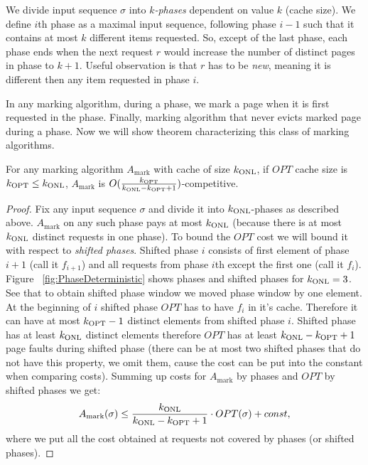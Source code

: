 We divide input sequence $\sigma$ into $k$\textit{-phases} dependent on value $k$ 
(cache size). We define $i$th phase as a maximal input sequence, following 
phase $i-1$ such that it contains at most $k$ different items requested. So, 
except of the last phase, each phase ends when the next request $r$ would 
increase the number of distinct pages in phase to $k+1$. Useful observation is 
that $r$ has to be \textit{new}, meaning it is different then any item requested 
in phase $i$.


In any marking algorithm, during a phase, we mark a page when it is first 
requested in the phase. Finally, marking algorithm that 
never evicts marked page during a phase. Now we will show theorem 
characterizing this class of marking algorithms.
\begin{theorem}\cite{torng}
For any marking algorithm $A_{\mathrm{mark}}$ with cache of size 
$k_{\mathrm{ONL}}$, if $OPT$ 
cache size is $k_{\mathrm{OPT}} \leq k_{\mathrm{ONL}}$, $A_{\mathrm{mark}}$ is 
$O(\frac{k_{\mathrm{OPT}}}{k_{\mathrm{ONL}}-k_{\mathrm{OPT}}+1})$-competitive.
\end{theorem}
\begin{proof}
Fix any input sequence $\sigma$ and divide it into $k_{\mathrm{ONL}}$-phases as described 
above. $A_{\mathrm{mark}}$ on any such phase pays at most $k_{\mathrm{ONL}}$ (because there is 
at most 
$k_{\mathrm{ONL}}$ distinct requests in one phase). To bound the $OPT$ cost we will bound it with 
respect to \textit{shifted phases}. Shifted phase $i$ consists 
of first element of phase $i+1$ (call it $f_{i+1}$) and all requests from phase 
$i$th except the first one (call it $f_i$). Figure 
~\ref{fig:PhaseDeterministic} shows phases and shifted phases for $k_{\mathrm{ONL}}=3$. See 
that to obtain shifted phase window we moved phase window by one element. At 
the beginning of $i$ shifted phase $OPT$ has to have $f_i$ in it's cache. 
Therefore it can have at most $k_{\mathrm{OPT}}-1$ distinct elements from shifted phase $i$. 
Shifted phase has at least $k_{\mathrm{ONL}}$ distinct elements therefore $OPT$ has at least 
$k_{\mathrm{ONL}}-k_{\mathrm{OPT}}+1$ page faults during shifted phase (there can be at most two shifted 
phases that do not have this property, we omit them, cause the cost can be put 
into the constant when comparing costs).
Summing up costs for $A_{\mathrm{mark}}$ by phases and $OPT$ by shifted phases 
we get:
$$ A_{\mathrm{mark}}(\sigma) \leq \frac{k_{\mathrm{ONL}}}{k_{\mathrm{ONL}}-k_{\mathrm{OPT}}+1} \cdot OPT(\sigma) + const,$$
where we put all the cost obtained at requests not covered by phases (or 
shifted phases).
\end{proof}
